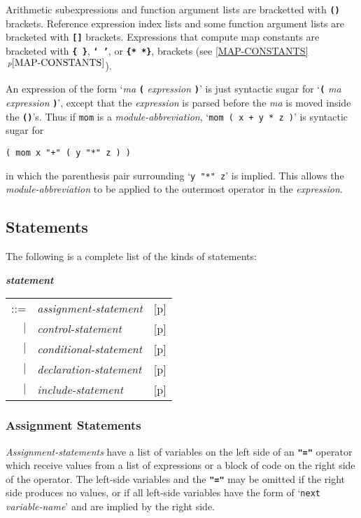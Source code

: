 \documentclass[12pt]{article}
\newcommand{\TT}[1]{{\tt \bfseries #1}}
\newcommand{\emkey}[1]{{\em \bfseries #1}}
\newcommand{\itemref}[1]{\ref{#1}$\,^{p\pageref{#1}}$}
\newcommand{\pagref}[1]{p\pageref{#1}}
\newenvironment{indpar}[1][0.3in]%
	{\begin{list}{}%
		     {\setlength{\itemsep}{0in}%
		      \setlength{\topsep}{0in}%
		      \setlength{\parsep}{1ex}%
		      \setlength{\labelwidth}{#1}%
		      \setlength{\leftmargin}{#1}%
		      \addtolength{\leftmargin}{\labelsep}}%
	 \item}%
	{\end{list}}
\begin{document}
Arithmetic subexpressions and function argument lists are bracketted
with \TT{()} brackets.  Reference expression index lists and some function
argument lists are bracketed with \TT{[]} brackets.
Expressions that compute map constants
are bracketed with \TT{\{~\}}, \TT{`~'}, or \TT{\{*~*\}},
brackets (see \itemref{MAP-CONSTANTS}).

An expression of the form `{\em ma} \TT{(} {\em expression} \TT{)}' is
just syntactic sugar for `\TT{(} {\em ma} {\em expression} \TT{)}', except
that the {\em expression} is parsed before the {\em ma} is moved inside the
\TT{()}'s.  Thus if {\tt mom} is a {\em module-abbreviation},
`{\tt mom ( x + y * z )}' is syntactic sugar for \\
\centerline{\tt ( mom x "+" ( y "*" z ) )}
in which the parenthesis pair surrounding `{\tt y "*" z}' is implied.
This allows the {\em module-abbre\-via\-tion} to be applied to the outermost
operator in the {\em expression}.

\subsection{Statements}
\label{STATEMENTS}

The following is a complete list of the kinds of statements:
\begin{indpar}
\emkey{statement}\label{STATEMENT}
    \begin{tabular}[t]{@{}rll}
    ::= & {\em assignment-statement}
        & [\pagref{ASSIGNMENT-STATEMENTS}] \\
    $|$ & {\em control-statement}
        & [\pagref{CONTROL-STATEMENT}] \\
    $|$ & {\em conditional-statement}
        & [\pagref{CONDITIONAL-STATEMENTS}] \\
    $|$ & {\em declaration-statement}
        & [\pagref{DECLARATION-STATEMENT}] \\
    $|$ & {\em include-statement}
        & [\pagref{INCLUDE-STATEMENT}] \\
    \end{tabular}
\end{indpar}

\subsubsection{Assignment Statements}
\label{ASSIGNMENT-STATEMENTS}

{\em Assignment-statements} have a list of variables on the
left side of an \TT{"="} operator
which receive values from a list of expressions or
a block of code on the right side of the operator.  The left-side variables
and the \TT{"="}
may be omitted if the right side produces no values,
or if all left-side variables
have the form of `{\tt next} {\em variable-name}' and are
implied by the right side.
\end{document}

